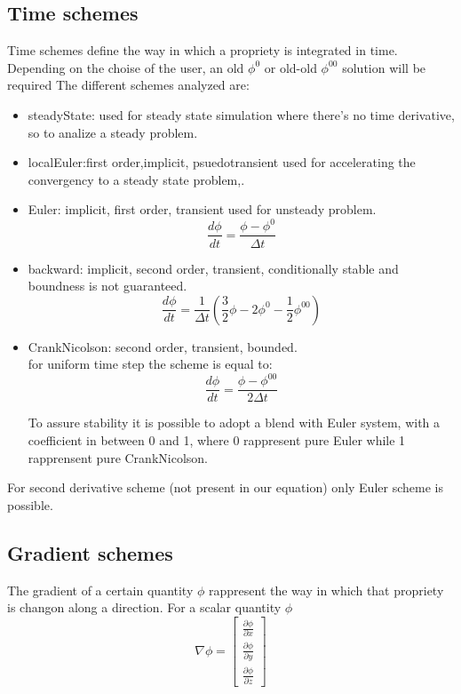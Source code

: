 \documentclass[a4paper,12pt]{article}
\begin{document}
\subsection{Time schemes}
Time schemes define the way in which a propriety is integrated in time. Depending on the choise of the user, an old $\phi^0$ or old-old $\phi^{00}$ solution will be required
The different schemes analyzed are:
\begin{itemize} 
 \item {\ttfamily steadyState}: used for steady state simulation where there's no time derivative, so to analize a steady problem.
 
 \item {\ttfamily localEuler}:first order,implicit, psuedotransient used for accelerating the convergency to a steady state problem,.
 
 \item {\ttfamily Euler}: implicit, first order, transient used for unsteady problem.
\begin{equation}
\frac{d \phi}{dt} = \frac{\phi - \phi^0}{\Delta t}
\end{equation} 

 
 \item {\ttfamily backward}: implicit, second order, transient, conditionally stable and boundness is not guaranteed.
\begin{equation}
\frac{d \phi}{dt} = \frac{1}{\Delta t}\left(\frac{3}{2}\phi - 2\phi^0- \frac{1}{2}\phi^{00}\right)
\end{equation} 
 
 \item {\ttfamily CrankNicolson}: second order, transient, bounded. \\for uniform time step the scheme is equal to:
\begin{equation}
 \frac{d \phi}{dt} = \frac{\phi - \phi^{00}}{2\Delta t}
\end{equation} 
 
To assure stability it is possible to adopt a blend with Euler system, with a coefficient in between 0 and 1, where 0 rappresent pure Euler while 1 rapprensent pure CrankNicolson.
 
 \end{itemize} 
 For second derivative scheme (not present in our equation) only Euler scheme is possible.

\subsection{Gradient schemes}
The gradient of a certain quantity $\phi$ rappresent the way in which that propriety is changon along a direction. For a scalar quantity $\phi$
\\ 
\begin{equation}
\nabla \phi = \begin{bmatrix} \frac{\partial \phi}{\partial x} \\ \frac{\partial \phi}{\partial y} \\\frac{\partial \phi}{\partial z}\end{bmatrix} 
\end{equation}
\end{document}
